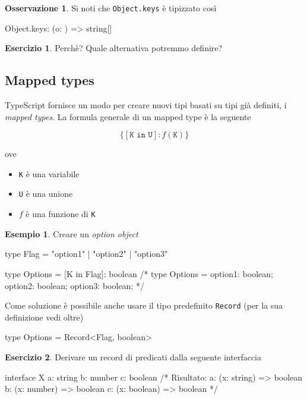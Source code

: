 \documentclass[12pt]{article}
\theoremstyle{definition}
\newtheorem{example}{Esempio}[subsection]
\newtheorem{exercise}{Esercizio}[subsection]
\newtheorem{observation}{Osservazione}[subsection]
\newenvironment{code}
  {\vspace{0.5cm} \VerbatimEnvironment\begin{typescriptcode}}
  {\end{typescriptcode} \vspace{0.2cm}}
\begin{document}
\begin{observation}
Si noti che \texttt{Object.keys} è tipizzato così

\begin{code}
Object.keys: (o: {}) => string[]
\end{code}
\end{observation}

\begin{exercise}
Perchè? Quale alternativa potremmo definire?
\end{exercise}

\subsection{Mapped types}

TypeScript fornisce un modo per creare nuovi tipi basati su tipi già definiti, i \emph{mapped types}.
La formula generale di un mapped type è la seguente

$$
\{ [\texttt{K in U}]: f(\texttt{K}) \}
$$

ove

\begin{itemize}
  \item \texttt{K} è una variabile
  \item \texttt{U} è una unione
  \item $f$ è una funzione di \texttt{K}
\end{itemize}

\begin{example}
Creare un \emph{option object}

\begin{code}
type Flag = "option1" | "option2" | "option3"

type Options = { [K in Flag]: boolean }
/*
type Options = {
    option1: boolean;
    option2: boolean;
    option3: boolean;
}
*/
\end{code}
\end{example}

Come soluzione è possibile anche usare il tipo predefinito \texttt{Record} (per la sua definizione vedi oltre)

\begin{code}
type Options = Record<Flag, boolean>
\end{code}

\begin{exercise}
Derivare un record di predicati dalla seguente interfaccia

\begin{code}
interface X {
  a: string
  b: number
  c: boolean
}
/*
Risultato:
{
  a: (x: string) => boolean
  b: (x: number) => boolean
  c: (x: boolean) => boolean
}
*/
\end{code}
\end{exercise}
\end{document}
